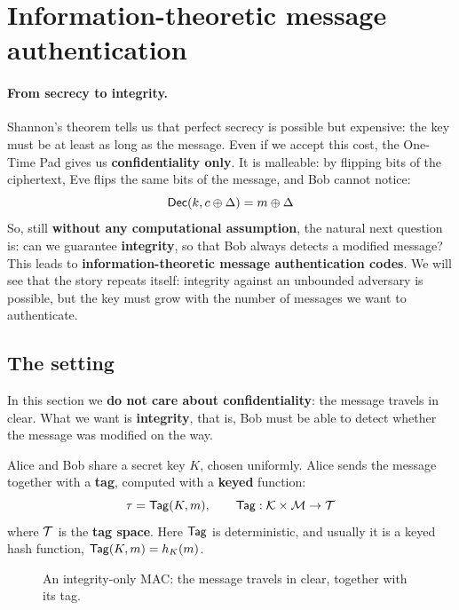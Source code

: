 
\section{Information-theoretic message authentication}

\paragraph{From secrecy to integrity.} Shannon's theorem tells us that perfect secrecy is possible but expensive: the key must be at least as long as the message. Even if we accept this cost, the One-Time Pad gives us \textbf{confidentiality only}. It is malleable: by flipping bits of the ciphertext, Eve flips the same bits of the message, and Bob cannot notice:
\[
  \mathsf{Dec}(k, c \oplus \Delta) = m \oplus \Delta
\]
So, still \textbf{without any computational assumption}, the natural next question is: can we guarantee \textbf{integrity}, so that Bob always detects a modified message? This leads to \textbf{information-theoretic message authentication codes}. We will see that the story repeats itself: integrity against an unbounded adversary is possible, but the key must grow with the number of messages we want to authenticate.

\subsection{The setting}

In this section we \textbf{do not care about confidentiality}: the message travels in clear. What we want is \textbf{integrity}, that is, Bob must be able to detect whether the message was modified on the way.

Alice and Bob share a secret key $K$, chosen uniformly. Alice sends the message together with a \textbf{tag}, computed with a \textbf{keyed} function:
\[
  \tau = \mathsf{Tag}(K, m), \qquad \mathsf{Tag} : \mathcal{K} \times \mathcal{M} \to \mathcal{T}
\]
where $\mathcal{T}$ is the \textbf{tag space}. Here $\mathsf{Tag}$ is deterministic, and usually it is a keyed hash function, $\mathsf{Tag}(K, m) = h_K(m)$.

\begin{figure}[H]
  \centering
  \caption{An integrity-only MAC: the message travels in clear, together with its tag.}
\end{figure}

